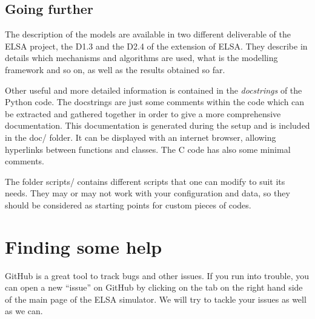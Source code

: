 \documentclass[12pt]{article}
\begin{document}
\subsection{Going further}

The description of the models are available in two different deliverable of the ELSA project, the D1.3 and the D2.4 of the extension of ELSA. They describe in details which mechanisms and algorithms are used, what is the modelling framework and so on, as well as the results obtained so far. 



Other useful and more detailed information is contained in the \textit{docstrings} of the Python code. The docstrings are just some comments within the code which can be extracted and gathered together in order to give a more comprehensive documentation. This documentation is generated during the setup and is included in the doc/ folder. It can be displayed with an internet browser, allowing hyperlinks between functions and classes. The C code has also some minimal comments. 

The folder scripts/ contains different scripts that one can modify to suit its needs. They may or may not work with your configuration and data, so they should be considered as starting points for custom pieces of codes.


\section*{Finding some help}
GitHub is a great tool to track bugs and other issues. If you run into trouble, you can open a new ``issue'' on GitHub by clicking on the tab on the right hand side of the main page of the ELSA simulator. We will try to tackle your issues as well as we can.
\end{document}
